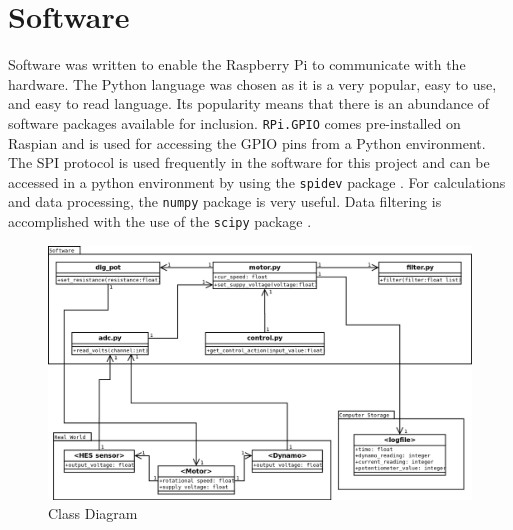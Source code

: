 \documentclass[twoside,a4]{report}
\begin{document}
	\section{Software} %
	Software was written to enable the Raspberry Pi to communicate with the hardware. The Python language was chosen as it is a very popular, easy to use, and easy to read language. Its popularity means that there is an abundance of software packages available for inclusion. \texttt{RPi.GPIO}\cite{citerpigpio} comes pre-installed on Raspian and is used for accessing the GPIO pins from a Python environment. The SPI protocol is used frequently in the software for this project and can be accessed in a python environment by using the \texttt{spidev} package \cite{srcspidev}. For calculations and data processing, the \texttt{numpy} package \cite{numpyref} is very useful. Data filtering is accomplished with the use of the \texttt{scipy} package \cite{scipyref}.\newline
	
	\begin{figure}[!htb]
		\centering
		\includegraphics[scale=0.35]{images/codemap.png}
		\caption{Class Diagram}
		\label{figcladia}
	\end{figure}
	
\end{document}
